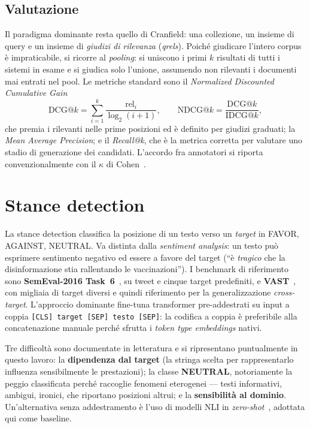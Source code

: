 \documentclass[11pt,a4paper]{report}
\begin{document}
\subsection{Valutazione}
Il paradigma dominante resta quello di Cranfield: una collezione, un insieme di query e un
insieme di \emph{giudizi di rilevanza} (\emph{qrels}). Poiché giudicare l'intero corpus è
impraticabile, si ricorre al \emph{pooling}: si uniscono i primi $k$ risultati di tutti i
sistemi in esame e si giudica solo l'unione, assumendo non rilevanti i documenti mai entrati
nel pool. Le metriche standard sono il \emph{Normalized Discounted Cumulative Gain}
\begin{equation}\label{eq:ndcg}
\text{DCG@}k = \sum_{i=1}^{k} \frac{\text{rel}_i}{\log_2(i+1)}, \qquad
\text{NDCG@}k = \frac{\text{DCG@}k}{\text{IDCG@}k},
\end{equation}
che premia i rilevanti nelle prime posizioni ed è definito per giudizi graduati; la \emph{Mean
Average Precision}; e il \emph{Recall@k}, che è la metrica corretta per valutare uno stadio di
generazione dei candidati. L'accordo fra annotatori si riporta convenzionalmente con il
$\kappa$ di Cohen~\cite{cohen}.

\section{Stance detection}
La stance detection classifica la posizione di un testo verso un \emph{target} in FAVOR,
AGAINST, NEUTRAL. Va distinta dalla \emph{sentiment analysis}: un testo può esprimere
sentimento negativo ed essere a favore del target (``è \emph{tragico} che la disinformazione
stia rallentando le vaccinazioni''). I benchmark di riferimento sono \textbf{SemEval-2016
Task~6}~\cite{semeval}, su tweet e cinque target predefiniti, e \textbf{VAST}~\cite{vast}, con
migliaia di target diversi e quindi riferimento per la generalizzazione \emph{cross-target}.
L'approccio dominante fine-tuna transformer pre-addestrati su input a coppia
\texttt{[CLS] target [SEP] testo [SEP]}: la codifica a coppia è preferibile alla
concatenazione manuale perché sfrutta i \emph{token type embeddings} nativi.

Tre difficoltà sono documentate in letteratura e si ripresentano puntualmente in questo
lavoro: la \textbf{dipendenza dal target} (la stringa scelta per rappresentarlo influenza
sensibilmente le prestazioni); la classe \textbf{NEUTRAL}, notoriamente la peggio classificata
perché raccoglie fenomeni eterogenei --- testi informativi, ambigui, ironici, che riportano
posizioni altrui; e la \textbf{sensibilità al dominio}. Un'alternativa senza addestramento è
l'uso di modelli NLI in \emph{zero-shot}~\cite{yin}, adottata qui come baseline.
\end{document}
